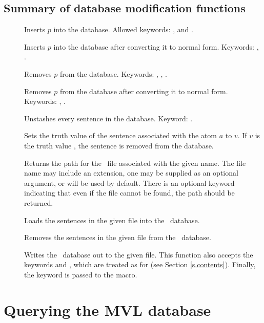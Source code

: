 \subsection{Summary of database modification functions}

\begin{description}
 \item [] Inserts $p$ into the database.  Allowed
keywords: ,  and \apa.
 \item [] Inserts $p$ into the database after
converting it to normal form.  Keywords: ,
.
 \item [] Removes $p$ from the database.  Keywords:
, , \apa.
 \item [] Removes $p$ from the database after
converting it to normal form.  Keywords: ,
.
 \item [] Unstashes every sentence in the database.  Keyword:
.
 \item [] Sets the truth value of the sentence
associated with the atom $a$ to $v$.  If $v$ is the truth value
, the sentence is removed from the database.
 \item [] Returns the path for the \mvl\ file
associated with the given name.  The file name may include an
extension, one may be supplied as an optional argument, or
 will be used by default.  There is an optional keyword
 indicating that even if the file cannot be found, the
path should be returned.
 \item [] Loads the sentences in the given file into
the \mvl\ database.
 \item [] Removes the sentences in the
given file from the \mvl\ database.
 \item [] Writes the \mvl\ database out to the
given file.  This function also accepts the keywords 
and , which are treated as for  (see
Section \ref{s.contents}).  Finally, the keyword  is
passed to the  macro.
 \end{description}

\section{Querying the MVL database}

